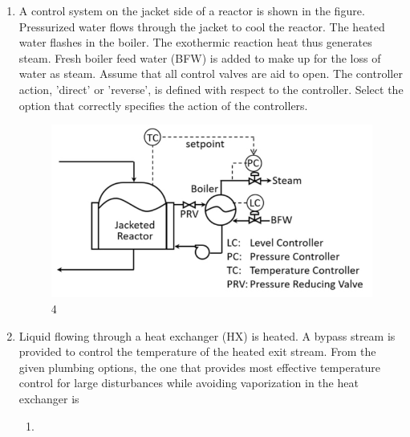 \documentclass[journal]{IEEEtran}
\numberwithin{equation}{enumi}
\numberwithin{figure}{enumi}
\begin{document}
\begin{enumerate}[start=1, label={Q\arabic*.}]
\begin{enumerate}
  \end{enumerate}
\item A control system on the jacket side of a reactor is shown in the figure. Pressurized water flows through the jacket to cool the reactor. The heated water flashes in the boiler. The exothermic reaction heat thus generates steam. Fresh boiler feed water (BFW) is added to make up for the loss of water as steam. Assume that all control valves are aid to open. The controller action, 'direct' or 'reverse', is defined with respect to the controller. Select the option that correctly specifies the action of the controllers.
  \begin{figure}[H]
      \centering
      \includegraphics[width=0.5\linewidth]{figs/fig4.jpeg}
      \caption{4}
      \label{fig:fig 4}
  \end{figure}
\begin{enumerate}
\end{enumerate}
\newpage
\item Liquid flowing through a heat exchanger (HX) is heated. A bypass stream is provided to control the temperature of the heated exit stream. From the given plumbing options, the one that provides most effective temperature control for large disturbances while avoiding vaporization in the heat exchanger is
\begin{enumerate}
    \item \begin{figure}[H]

\end{figure}
\end{enumerate}
\end{enumerate}
\end{document}
